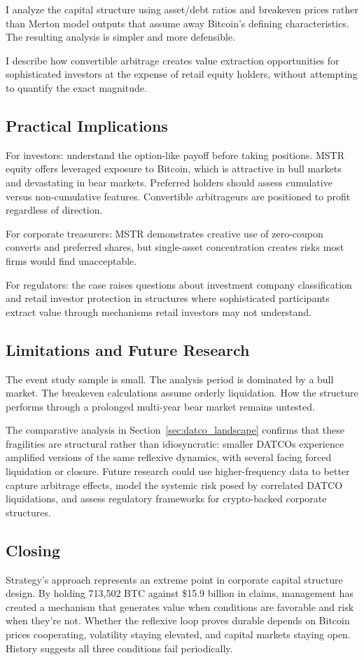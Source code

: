 I analyze the capital structure using asset/debt ratios and breakeven prices rather than Merton model outputs that assume away Bitcoin's defining characteristics. The resulting analysis is simpler and more defensible.

I describe how convertible arbitrage creates value extraction opportunities for sophisticated investors at the expense of retail equity holders, without attempting to quantify the exact magnitude.

\subsection{Practical Implications}

For investors: understand the option-like payoff before taking positions. MSTR equity offers leveraged exposure to Bitcoin, which is attractive in bull markets and devastating in bear markets. Preferred holders should assess cumulative versus non-cumulative features. Convertible arbitrageurs are positioned to profit regardless of direction.

For corporate treasurers: MSTR demonstrates creative use of zero-coupon converts and preferred shares, but single-asset concentration creates risks most firms would find unacceptable.

For regulators: the case raises questions about investment company classification and retail investor protection in structures where sophisticated participants extract value through mechanisms retail investors may not understand.

\subsection{Limitations and Future Research}

The event study sample is small. The analysis period is dominated by a bull market. The breakeven calculations assume orderly liquidation. How the structure performs through a prolonged multi-year bear market remains untested.

The comparative analysis in Section~\ref{sec:datco_landscape} confirms that these fragilities are structural rather than idiosyncratic: smaller DATCOs experience amplified versions of the same reflexive dynamics, with several facing forced liquidation or closure. Future research could use higher-frequency data to better capture arbitrage effects, model the systemic risk posed by correlated DATCO liquidations, and assess regulatory frameworks for crypto-backed corporate structures.

\subsection{Closing}

Strategy's approach represents an extreme point in corporate capital structure design. By holding 713,502 BTC against \$15.9 billion in claims, management has created a mechanism that generates value when conditions are favorable and risk when they're not. Whether the reflexive loop proves durable depends on Bitcoin prices cooperating, volatility staying elevated, and capital markets staying open. History suggests all three conditions fail periodically.

